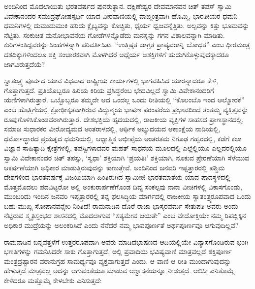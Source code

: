 \vskip 1pt

ಅಂದಿನಿಂದ ಮೊದಲಾಯಿತು ಭರತವರ್ಷದ ಪುನರುತ್ಥಾನ. ದಕ್ಷಿಣೇಶ್ವರ ದೇವಮಾನವನ ಚಿತ್​ ತಪಸ್​ ಸ್ವಾಮಿ ವಿವೇಕಾನಂದರ ಸಮುದ್ರಘೋಷಸ್ಪರ್ಧಿ ಯಾದ ವೀರವಾಣಿಯಲ್ಲಿ ವಾಙ್ಮಂತ್ರವಾಗಿ ಹೊಮ್ಮಿ, ಭಾರತೀಯರ ಧಮನಿ ಧಮನಿಗಳಲ್ಲಿ ದುಮುದುಮುಕಿ ಹರಿದು ಕ್ಲೈಬ್ಯವನ್ನು ಕೊಚ್ಚಿತು, ಧೈರ್ಯ ಧ್ವಜವನ್ನೆತ್ತಿತು. ಅಲ್ಪವನ್ನು ಕಿತ್ತು ಭೂಮವನ್ನು ನೆಟ್ಟಿತು. ಸಂಕುಚಿತ ಮನೋಭಾವನೆಯ ಗೋಡೆಗಳನ್ನೊಡೆದು ಮನಸ್ಸನ್ನು ಗಗನ ವಿಶಾಲವನ್ನಾಗಿ ಮಾಡಿತು. ಕುರಿಗಳಂತಿದ್ದವರನ್ನು ಸಿಂಹಗಳನ್ನಾಗಿ ಪರಿವರ್ತಿಸಿತು. “ಉತ್ತಿಷ್ಠತ ಜಾಗ್ರತ ಪ್ರಾಪ್ಯವರಾನ್ನಿ ಬೋಧತ” ಎಂಬ ಧೀರಮಂತ್ರ ದಶದಿಕ್ಕುಗಳಿಂದಲೂ ಶಕ್ತಿ ಸಂಚಾರಕವಾಗಿ ಮೊಳಗಿದರೆ ಅಧೈರ್ಯ ಅಶಕ್ತಿಗಳಿಗೆ ಹುದುಗಿಕೊಳ್ಳುವುದಕ್ಕಾದರೂ ಜಾಗವಿರುತ್ತದೆಯೆ?

ಸ್ವಾತಂತ್ರ್ಯ ಪೂರ್ವದ ಯಾವ ವಿಧವಾದ ರಾಷ್ಟ್ರೀಯ ಕಾರ್ಯಗಳಲ್ಲಿ ಭಾಗವಹಿಸಿದ ಯಾರನ್ನಾದರೂ ಕೇಳಿ, ಗೊತ್ತಾಗುತ್ತದೆ. ಪ್ರತಿಯೊಬ್ಬರೂ ಹಿರಿಯ ಕಿರಿಯ ಪ್ರಸಿದ್ಧರೆಂಬ ಭೇದವಿಲ್ಲದೆ ಸ್ವಾಮಿ ವಿವೇಕಾನಂದರಿಗೆ ಋಣಿಗಳಾಗಿರುತ್ತಾರೆ. ಒಬ್ಬೊಬ್ಬರೂ ತಮ್ಮದೇ ಆದ ಒಂದಲ್ಲ ಒಂದು ರೀತಿಯಲ್ಲಿ “ಕೊಲಂಬೊ ಇಂದ ಆಲ್ಮೋರಕೆ” ಎಂಬ ಹೊತ್ತಿಗೆಯಲ್ಲಿ ಕ್ರೋಢೀಕೃತವಾಗಿರುವ ವಿದ್ಯುನ್ಮಯ ಭಾಷಣ ಪರಂಪರೆಯ ಪ್ರಭಾವದಿಂದ ತಂತಮ್ಮ ವ್ಯಕ್ತಿತ್ವವನ್ನು ರೂಪುಗೊಳಿಸಿಕೊಂಡವರಾಗಿರುತ್ತಾರೆ. ದೇಶಭಕ್ತಿಯ ಹೃದಯದಲ್ಲಿ, ರಾಜಕೀಯ ವ್ಯಕ್ತಿಗಳ ಸಾಹಸದ ಪ್ರಾಣಸ್ಥಾನದಲ್ಲಿ, ಸಮಾಜ ಸುಧಾರಕರ ವೀರೋದ್ಯಮದ ಅಂತರಾಳದಲ್ಲಿ, ಆರ್ಥಿಕ ಅಭ್ಯುದಯದ ಆಕಾಂಕ್ಷೆಯ ನಾಡಿಯಲ್ಲಿ, ಧರ್ಮೋದ್ಧಾರದ ಪ್ರಯತ್ನದ ಧಮನಿಯಲ್ಲಿ, ಆಧ್ಯಾತ್ಮಿಕ ಅಭೀಪ್ಸೆಯ ಅಂತರತಮ ನಿಗೂಢ ಗಹ್ವರದಲ್ಲಿ, ಕಡೆಗೆ ಕಲಾ ವಿಜ್ಞಾನ ಸಾಹಿತ್ಯಾದಿ ಕ್ಷೇತ್ರಗಳಲ್ಲಿ, ತಪಸ್ವಿಗಳಾದವರ ಮಹತ್​ ಸಾಧನೆಯ ಮೂಲದಲ್ಲಿ ಎಲ್ಲೆಲ್ಲಿಯೂ ಎಲ್ಲದರಲ್ಲಿಯೂ ಸ್ವಾಮಿ ವಿವೇಕಾನಂದರ ಚಿತ್​ ತಪಸ್ಸು, ‘ಸ್ವಧಾ’ ಶಕ್ತಿಯಾಗಿ ‘ಪ್ರಯತಿಃ’ ಶಕ್ತಿಯಾಗಿ, ನೂಕುವ ಪ್ರೇರಣೆಯಾಗಿ ಸೆಳೆಯುವ ಆಕರ್ಷಣೆಯಾಗಿ ಅಧಿಕಾರ ಮಾಡುತ್ತಿರುವುದನ್ನು ಕಾಣುತ್ತೇವೆ. ಅಂದಿನಿಂದ ಜನವರಿ ಇಪ್ಪತ್ತಾರರಲ್ಲಿ ಪಶ್ಚಿಮ ದೇಶಗಳಿಂದ ಭಾರತವರ್ಷಕ್ಕೆ ವಿಜಯಿಯಾಗಿ ಹಿಂತಿರುಗಿದ ಸ್ವಾಮೀಜಿ ಭಾರತಮಾತೆಯ ಯಾವ ಪಾದಸ್ಥಳದಲ್ಲಿ ಮೊತ್ತಮೊದಲು ಪದವಿಟ್ಟರೋ ಅಲ್ಲಿ ಅಂಕುರಾರ್ಪಣೆಗೊಂಡ ದಿವ್ಯ ಸಂಕಲ್ಪವು ನಾನಾ ವೀಚಿಗಳಲ್ಲಿ ವಿಕಾಸಗೊಂಡು, ಮುಂಬರಿದು ಇಂದಿನ ಜನವರಿ ಇಪ್ಪತ್ತಾರರಲ್ಲಿ ತನ್ನ ಫಲಸಿದ್ಧಿಯ ಮಾರ್ಗದಲ್ಲಿ ರಾಜಕೀಯ ಸ್ವಾತಂತ್ರ್ಯರೂಪವಾದ ಒಂದು ಬಹು ಮುಖ್ಯ ಸೋಪಾನವನ್ನೇರಿ ನಿಂತಿದೆ! ರಾಮನಾಡಿನ ದೊರೆ ರಾಜಾ ಭಾಸ್ಕರವರ್ಮ ಸೇತುಪತಿ ಅವರು ಅಂದು ನೆಟ್ಟಿರುವ ಸ್ಮೃತಿಸ್ತಂಭದ ಶಾಸನದಲ್ಲಿ ಮೊದಲಾಗುವ “ಸತ್ಯಮೇವ ಜಯತೇ” ಎಂಬ ವೇದೋಕ್ತಿಯೇ ನಮ್ಮ ರಿಪಬ್ಲಿಕ್ಕಿನ ಅಧಿಕಾರ ಮುದ್ರೆಯನ್ನು ಅಲಂಕರಿಸಿದೆ ಎಂದು ನೆನೆದರೆ ನಮ್ಮ ಭಾವಪೂರ್ಣತೆ ಅರ್ಥಪೂರ್ಣವೂ ಆಗುವುದಿಲ್ಲವೆ?

ರಾಮನಾಡಿನ ಬಿನ್ನವತ್ತಳೆಗೆ ಉತ್ತರರೂಪವಾಗಿ ಅವರು ಮಾಡಿದ\break ಭಾಷಣದ ಆದಿಯಲ್ಲಿಯೇ ವಿನ್ಯಾಸಗೊಂಡಿರುವ ಭಂಗಿ ಭಣತಿಗಳನ್ನು ಗಮನಿ\-ಸಿದರೇ ಸಾಕು ಗೊತ್ತಾಗುತ್ತದೆ, ಅಲ್ಲಿ ಪ್ರವಾದಿಯ ಭವಿಷ್ಯವಾಣಿ ಮಾತ್ರವಲ್ಲದೆ ಶಕ್ತಿಪೂರ್ಣ ಮಂತ್ರದ್ರಷ್ಟಾರನ ವರಾನುಗ್ರಹ ಸಾಮರ್ಥ್ಯವೂ ವ್ಯಕ್ತವಾಗುತ್ತದೆ ಎಂದು. ಆ ವಾಣಿ ಆ ರೀತಿ ಮುಂದಾಗುವುದನ್ನು ಹೇಳುತ್ತದೆ ಮಾತ್ರವಲ್ಲ ಅದನ್ನು ಆಗುವಂತೆಯೂ ಮಾಡುವ ಆಶ್ವಾಸನೆಯನ್ನೂ ನೀಡುತ್ತದೆ. ಆಲಿಸಿ; ಎನಿತೊಮ್ಮೆ ಕೇಳಿದರೂ ಮತ್ತೊಮ್ಮೆ ಕೇಳಬೇಕು ಎನಿಸುತ್ತದೆ:

